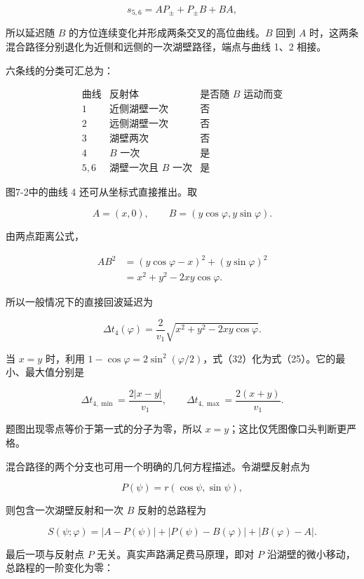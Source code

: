 \documentclass[12pt,a4paper,UTF8]{ctexart}
\begin{document}
\[
s_{5,6}=AP_\pm+P_\pm B+BA, \tag{28}
\]

所以延迟随 \(B\) 的方位连续变化并形成两条交叉的高位曲线。\(B\) 回到
\(A\) 时，这两条混合路径分别退化为近侧和远侧的一次湖壁路径，端点与曲线
1、2 相接。

六条线的分类可汇总为：

\[
\begin{array}{c|c|c}
\text{曲线}&\text{反射体}&\text{是否随 }B\text{ 运动而变}\\ \hline
1&\text{近侧湖壁一次}&\text{否}\\
2&\text{远侧湖壁一次}&\text{否}\\
3&\text{湖壁两次}&\text{否}\\
4&B\text{ 一次}&\text{是}\\
5,6&\text{湖壁一次且 }B\text{ 一次}&\text{是}
\end{array} \tag{29}
\]

图7-2中的曲线 4 还可从坐标式直接推出。取

\[
A=(x,0),
\qquad
B=(y\cos\varphi,y\sin\varphi). \tag{30}
\]

由两点距离公式，

\[
\begin{aligned}
AB^2
&=(y\cos\varphi-x)^2+(y\sin\varphi)^2\\
&=x^2+y^2-2xy\cos\varphi.
\end{aligned} \tag{31}
\]

所以一般情况下的直接回波延迟为

\[
\boxed{
\Delta t_4(\varphi)
=\frac{2}{v_1}
\sqrt{x^2+y^2-2xy\cos\varphi}
}. \tag{32}
\]

当 \(x=y\) 时，利用
\(1-\cos\varphi=2\sin^2(\varphi/2)\)，式（32）化为式（25）。它的最小、最大值分别是

\[
\Delta t_{4,\min}=\frac{2|x-y|}{v_1},
\qquad
\Delta t_{4,\max}=\frac{2(x+y)}{v_1}. \tag{33}
\]

题图出现零点等价于第一式的分子为零，所以
\(x=y\)；这比仅凭图像口头判断更严格。

混合路径的两个分支也可用一个明确的几何方程描述。令湖壁反射点为

\[
P(\psi)=r(\cos\psi,\sin\psi), \tag{34}
\]

则包含一次湖壁反射和一次 \(B\) 反射的总路程为

\[
S(\psi;\varphi)
=|A-P(\psi)|+|P(\psi)-B(\varphi)|+|B(\varphi)-A|. \tag{35}
\]

最后一项与反射点 \(P\) 无关。真实声路满足费马原理，即对 \(P\)
沿湖壁的微小移动，总路程的一阶变化为零：
\end{document}
